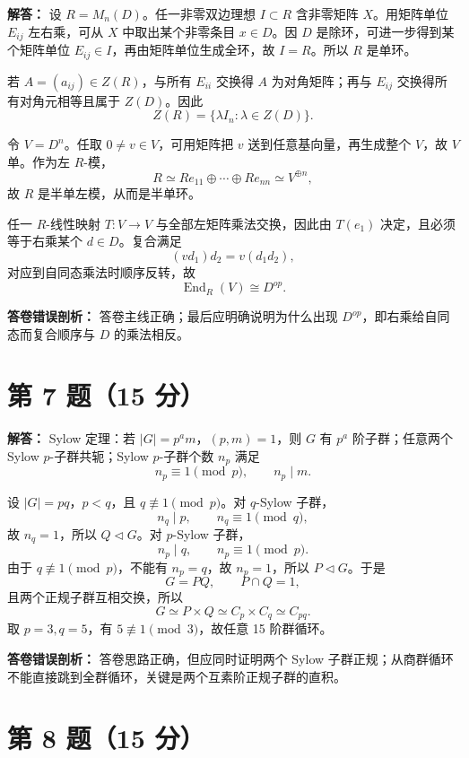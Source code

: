 \documentclass[11pt]{article}
\begin{document}
\textbf{解答：}
设 \(R=M_n(D)\)。任一非零双边理想 \(I\subset R\) 含非零矩阵 \(X\)。用矩阵单位 \(E_{ij}\) 左右乘，可从 \(X\) 中取出某个非零条目 \(x\in D\)。因 \(D\) 是除环，可进一步得到某个矩阵单位 \(E_{ij}\in I\)，再由矩阵单位生成全环，故 \(I=R\)。所以 \(R\) 是单环。

若 \(A=(a_{ij})\in Z(R)\)，与所有 \(E_{ii}\) 交换得 \(A\) 为对角矩阵；再与 \(E_{ij}\) 交换得所有对角元相等且属于 \(Z(D)\)。因此
\[
  Z(R)=\{\lambda I_n:\lambda\in Z(D)\}.
\]

令 \(V=D^n\)。任取 \(0\neq v\in V\)，可用矩阵把 \(v\) 送到任意基向量，再生成整个 \(V\)，故 \(V\) 单。作为左 \(R\)-模，
\[
  R\simeq Re_{11}\oplus\cdots\oplus Re_{nn}\simeq V^{\oplus n},
\]
故 \(R\) 是半单左模，从而是半单环。

任一 \(R\)-线性映射 \(T:V\to V\) 与全部左矩阵乘法交换，因此由 \(T(e_1)\) 决定，且必须等于右乘某个 \(d\in D\)。复合满足
\[
  (v d_1)d_2=v(d_1d_2),
\]
对应到自同态乘法时顺序反转，故
\[
  \operatorname{End}_R(V)\cong D^{op}.
\]

\textbf{答卷错误剖析：}
答卷主线正确；最后应明确说明为什么出现 \(D^{op}\)，即右乘给自同态而复合顺序与 \(D\) 的乘法相反。

\section*{第 7 题（15 分）}

\textbf{解答：}
Sylow 定理：若 \(|G|=p^am\)，\((p,m)=1\)，则 \(G\) 有 \(p^a\) 阶子群；任意两个 Sylow \(p\)-子群共轭；Sylow \(p\)-子群个数 \(n_p\) 满足
\[
  n_p\equiv1\pmod p,\qquad n_p\mid m.
\]

设 \(|G|=pq\)，\(p<q\)，且 \(q\not\equiv1\pmod p\)。对 \(q\)-Sylow 子群，
\[
  n_q\mid p,\qquad n_q\equiv1\pmod q,
\]
故 \(n_q=1\)，所以 \(Q\triangleleft G\)。对 \(p\)-Sylow 子群，
\[
  n_p\mid q,\qquad n_p\equiv1\pmod p.
\]
由于 \(q\not\equiv1\pmod p\)，不能有 \(n_p=q\)，故 \(n_p=1\)，所以 \(P\triangleleft G\)。于是
\[
  G=PQ,\qquad P\cap Q=1,
\]
且两个正规子群互相交换，所以
\[
  G\simeq P\times Q\simeq C_p\times C_q\simeq C_{pq}.
\]
取 \(p=3,q=5\)，有 \(5\not\equiv1\pmod3\)，故任意 15 阶群循环。

\textbf{答卷错误剖析：}
答卷思路正确，但应同时证明两个 Sylow 子群正规；从商群循环不能直接跳到全群循环，关键是两个互素阶正规子群的直积。

\section*{第 8 题（15 分）}
\end{document}
